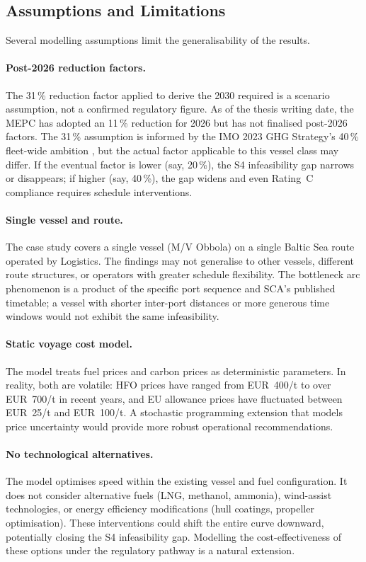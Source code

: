 \subsection{Assumptions and Limitations}
\label{sec:disc:limitations}

Several modelling assumptions limit the generalisability of the results.

\paragraph{Post-2026 reduction factors.}
The 31\,\% reduction factor applied to derive the 2030 required \CII{}
is a scenario assumption, not a confirmed regulatory figure.  As of the
thesis writing date, the \IMO{} MEPC has adopted an 11\,\% reduction for
2026 but has not finalised post-2026 factors.  The 31\,\% assumption is
informed by the IMO 2023 GHG Strategy's 40\,\% fleet-wide ambition
\parencite{mepc377}, but the actual factor applicable to this vessel class
may differ.  If the eventual factor is lower (say, 20\,\%), the S4
infeasibility gap narrows or disappears; if higher (say, 40\,\%), the
gap widens and even Rating~C compliance requires schedule interventions.

\paragraph{Single vessel and route.}
The case study covers a single vessel (M/V Obbola) on a single Baltic
Sea route operated by \SCA{} Logistics.  The findings may not generalise
to other \RoRo{} vessels, different route structures, or operators with
greater schedule flexibility.  The bottleneck arc phenomenon is a
product of the specific port sequence and SCA's published timetable; a
vessel with shorter inter-port distances or more generous time windows
would not exhibit the same infeasibility.

\paragraph{Static voyage cost model.}
The model treats fuel prices and carbon prices as deterministic
parameters.  In reality, both are volatile: HFO prices have ranged from
EUR~400/t to over EUR~700/t in recent years, and EU \ETS{} allowance
prices have fluctuated between EUR~25/t and EUR~100/t.  A stochastic
programming extension that models price uncertainty would provide
more robust operational recommendations.

\paragraph{No technological alternatives.}
The model optimises speed within the existing vessel and fuel
configuration.  It does not consider alternative fuels (LNG, methanol,
ammonia), wind-assist technologies, or energy efficiency modifications
(hull coatings, propeller optimisation).  These interventions could
shift the entire \CII{} curve downward, potentially closing the S4
infeasibility gap.  Modelling the cost-effectiveness of these options
under the \CII{} regulatory pathway is a natural extension.

